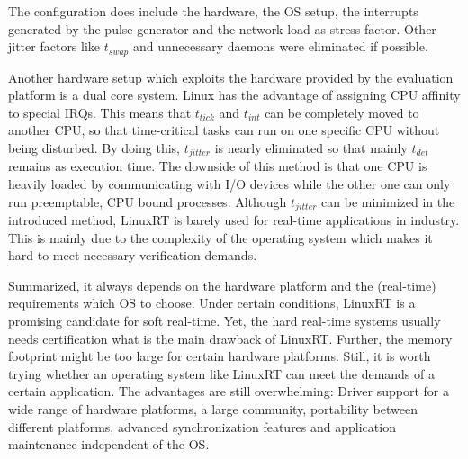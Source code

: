 The configuration does include the hardware, the \ac{OS} setup, the interrupts generated by the pulse generator and the network load as stress factor.
Other jitter factors like $t_{swap}$ and unnecessary daemons were eliminated if possible.
\par
Another hardware setup which exploits the hardware provided by the evaluation platform is a dual core system. 
Linux has the advantage of assigning \ac{CPU} affinity to special \acp{IRQ}.
This means that $t_{tick}$ and $t_{int}$ can be completely moved to another \ac{CPU}, so that time-critical tasks can run on one specific \ac{CPU} without being disturbed.
By doing this, $t_{jitter}$ is nearly eliminated so that mainly $t_{det}$ remains as execution time.
The downside of this method is that one \ac{CPU} is heavily loaded by communicating with \ac{I/O} devices while the other one can only run preemptable, \ac{CPU} bound processes.
Although $t_{jitter}$ can be minimized in the introduced method, LinuxRT is barely used for real-time applications in industry.
This is mainly due to the complexity of the operating system which makes it hard to meet necessary verification demands.
\par
Summarized, it always depends on the hardware platform and the (real-time) requirements which \ac{OS} to choose.
Under certain conditions, LinuxRT is a promising candidate for soft real-time.
Yet, the hard real-time systems usually needs certification what is the main drawback of LinuxRT. 
Further, the memory footprint might be too large for certain hardware platforms. 
Still, it is worth trying whether an operating system like LinuxRT can meet the demands of a certain application.
The advantages are still overwhelming: Driver support for a wide range of hardware platforms, a large community, portability between different platforms, advanced synchronization features and application maintenance independent of the \ac{OS}.  



